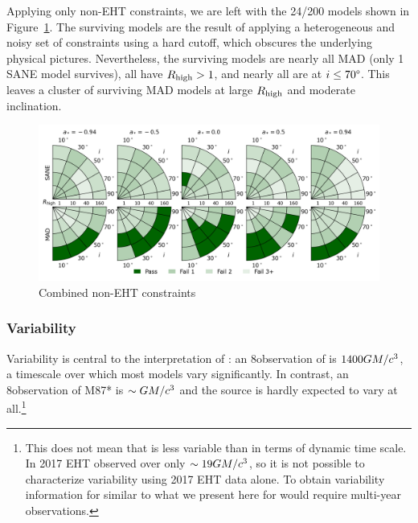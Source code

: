 
Applying only non-EHT constraints, we are left with the 24/200 models shown in Figure~\ref{fig:non_eht_cuts}. The surviving models are the result of applying a heterogeneous and noisy set of constraints using a hard cutoff, which obscures the underlying physical pictures.  Nevertheless, the surviving models are nearly all MAD (only 1 SANE model survives), all have $R_\mathrm{high} > 1$, and nearly all are at $i \le 70\degree$.  This leaves a cluster of surviving MAD models at large $R_\mathrm{high}$ and moderate inclination.

\begin{figure}
  \centering
  \includegraphics[width=\textwidth]{./figures/Non_Interferometric_Constraints.png}
  \caption{Combined non-EHT constraints}
  \label{fig:non_eht_cuts}
\end{figure}

\subsubsection{Variability}

Variability is central to  the interpretation of \sgra: an 8\hr observation of \sgra is $1400 GM/c^3$, a timescale over which most models vary significantly.  In contrast, an 8\hr observation of M87* is $\sim GM/c^3$ and the source is hardly expected to vary at all.\footnote{This does not mean that  is less variable than \sgra in terms of dynamic time scale.  In 2017 EHT observed  over only $\sim 19GM/c^3$, so it is not possible to characterize  variability using 2017 EHT data alone.  To obtain variability information for  similar to what we present here for \sgra would require multi-year observations.}


